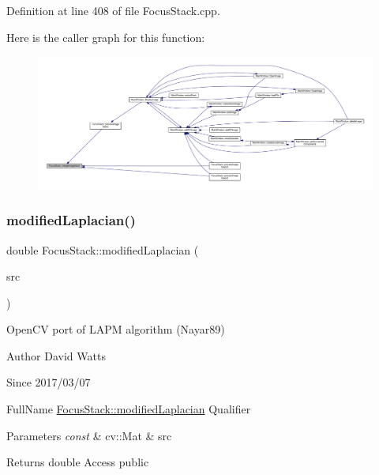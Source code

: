 Definition at line 408 of file Focus\+Stack.\+cpp.

Here is the caller graph for this function\+:
\nopagebreak
\begin{figure}[H]
\begin{center}
\leavevmode
\includegraphics[width=350pt]{class_focus_stack_ac55d6cde57441ffd9b023fc936529802_icgraph}
\end{center}
\end{figure}
\mbox{\label{class_focus_stack_a4aaf824aa1df503f99c24e3cf9a40189}} 
\subsubsection{\texorpdfstring{modified\+Laplacian()}{modifiedLaplacian()}}
{\footnotesize\ttfamily double Focus\+Stack\+::modified\+Laplacian (\begin{DoxyParamCaption}\item[{const cv\+::\+Mat \&}]{src }\end{DoxyParamCaption})\hspace{0.3cm}{\ttfamily [static]}}

Open\+CV port of \textquotesingle{}L\+A\+PM\textquotesingle{} algorithm (Nayar89)

\begin{DoxyAuthor}{Author}
David Watts 
\end{DoxyAuthor}
\begin{DoxySince}{Since}
2017/03/07
\end{DoxySince}
Full\+Name \hyperlink{class_focus_stack_a4aaf824aa1df503f99c24e3cf9a40189}{Focus\+Stack\+::modified\+Laplacian} Qualifier 
\begin{DoxyParams}{Parameters}
{\em const} & cv\+::\+Mat \& src \\
\hline
\end{DoxyParams}
\begin{DoxyReturn}{Returns}
double Access public 
\end{DoxyReturn}


